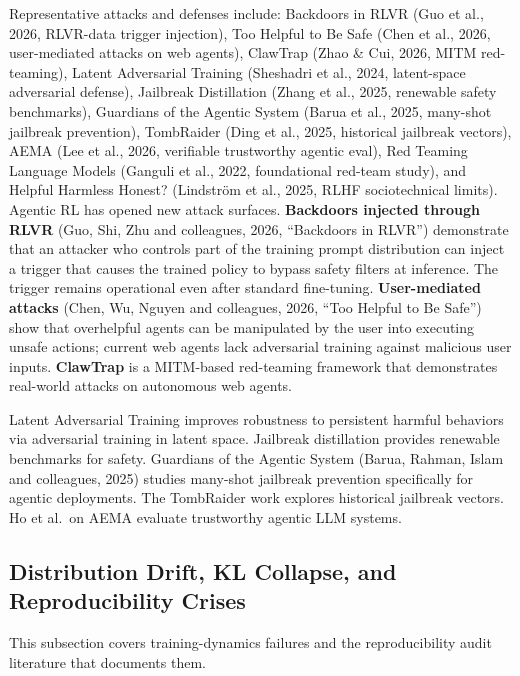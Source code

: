 \documentclass{article}
\begin{document}
Representative attacks and defenses include: Backdoors in RLVR (Guo et al., 2026, RLVR-data trigger injection), Too Helpful to Be Safe (Chen et al., 2026, user-mediated attacks on web agents), ClawTrap (Zhao \& Cui, 2026, MITM red-teaming), Latent Adversarial Training (Sheshadri et al., 2024, latent-space adversarial defense), Jailbreak Distillation (Zhang et al., 2025, renewable safety benchmarks), Guardians of the Agentic System (Barua et al., 2025, many-shot jailbreak prevention), TombRaider (Ding et al., 2025, historical jailbreak vectors), AEMA (Lee et al., 2026, verifiable trustworthy agentic eval), Red Teaming Language Models (Ganguli et al., 2022, foundational red-team study), and Helpful Harmless Honest? (Lindström et al., 2025, RLHF sociotechnical limits). Agentic RL has opened new attack surfaces. \textbf{Backdoors injected through RLVR} (Guo, Shi, Zhu and colleagues, 2026, ``Backdoors in RLVR'') demonstrate that an attacker who controls part of the training prompt distribution can inject a trigger that causes the trained policy to bypass safety filters at inference. The trigger remains operational even after standard fine-tuning. \textbf{User-mediated attacks} (Chen, Wu, Nguyen and colleagues, 2026, ``Too Helpful to Be Safe'') show that overhelpful agents can be manipulated by the user into executing unsafe actions; current web agents lack adversarial training against malicious user inputs. \textbf{ClawTrap} \citep{zhao2026clawtrapamitmbased} is a MITM-based red-teaming framework that demonstrates real-world attacks on autonomous web agents.

Latent Adversarial Training \citep{sheshadri20242024} improves robustness to persistent harmful behaviors via adversarial training in latent space. Jailbreak distillation \citep{zhang20252025} provides renewable benchmarks for safety. Guardians of the Agentic System (Barua, Rahman, Islam and colleagues, 2025) studies many-shot jailbreak prevention specifically for agentic deployments. The TombRaider \citep{ding2026adarubrictaskadapt} work explores historical jailbreak vectors. Ho et al.~on AEMA \citep{lee20262026} evaluate trustworthy agentic LLM systems.

\subsection{Distribution Drift, KL Collapse, and Reproducibility Crises}\label{distribution-drift-kl-collapse-and-reproducibility-crises}

This subsection covers training-dynamics failures and the reproducibility audit literature that documents them.
\end{document}
